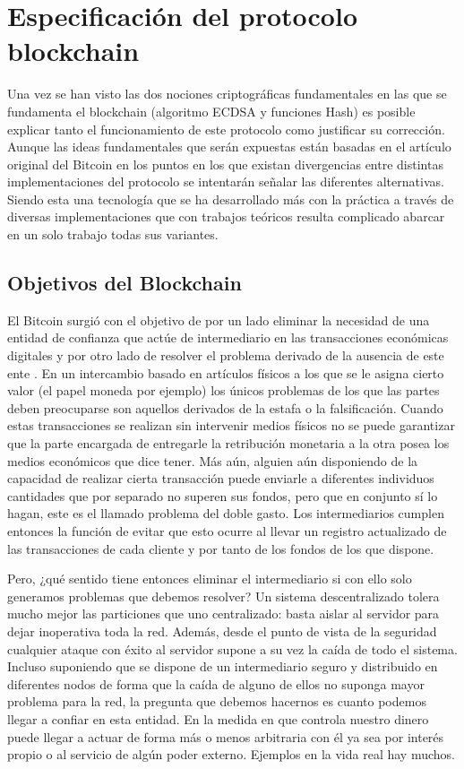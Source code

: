 \cleardoublepage

\chapter{Especificación del protocolo blockchain}
\label{cap3}
Una vez se han visto las dos nociones criptográficas fundamentales en las que se fundamenta el blockchain (algoritmo ECDSA y funciones Hash) es posible explicar tanto el funcionamiento de este protocolo como justificar su corrección. 
Aunque las ideas fundamentales que serán expuestas están basadas en el artículo original del Bitcoin \citep{bitcoin} en los puntos en los que existan divergencias entre distintas implementaciones del protocolo se intentarán señalar las diferentes alternativas. Siendo esta una tecnología que se ha desarrollado más con la práctica a través de diversas implementaciones que con trabajos teóricos resulta complicado abarcar en un solo trabajo todas sus variantes.

\section{Objetivos del Blockchain}\label{objetivos}
El Bitcoin surgió con el objetivo de por un lado eliminar la necesidad  de una entidad de confianza que actúe de intermediario en las transacciones económicas digitales y por otro lado de resolver el problema derivado de la ausencia de este ente \citep{bitcoin}. En un intercambio basado en artículos físicos a los que se le asigna cierto valor (el papel moneda por ejemplo) los únicos problemas de los que las partes deben preocuparse son aquellos derivados de la estafa o la falsificación. Cuando estas transacciones se realizan sin intervenir medios físicos no se puede garantizar que la parte encargada de entregarle la retribución monetaria a la otra posea los medios económicos que dice tener. Más aún, alguien aún disponiendo de la capacidad de realizar cierta transacción puede enviarle a diferentes individuos cantidades que por separado no superen sus fondos, pero que en conjunto sí lo hagan, este es el llamado problema del doble gasto. Los intermediarios cumplen entonces la función de evitar que esto ocurre al llevar un registro actualizado de las transacciones de cada cliente y por tanto de los fondos de los que dispone.

Pero, ¿qué sentido tiene entonces eliminar el intermediario si con ello solo generamos problemas que debemos resolver? Un sistema descentralizado tolera mucho mejor las particiones que uno centralizado: basta aislar al servidor para dejar inoperativa toda la red. Además, desde el punto de vista de la seguridad cualquier ataque con éxito al servidor supone a su vez la caída de todo el sistema. Incluso suponiendo que se dispone de un intermediario seguro y distribuido en diferentes nodos de forma que la caída de alguno de ellos no suponga mayor problema para la red, la pregunta que debemos hacernos es cuanto podemos llegar a confiar en esta entidad. En la medida en que controla nuestro dinero puede llegar a actuar de forma más o menos arbitraria con él ya sea por interés propio o al servicio de algún poder externo. Ejemplos en la vida real hay muchos.

